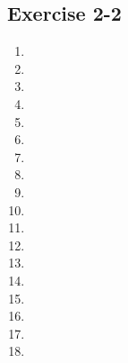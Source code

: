 \subsection{Exercise 2-2} %
\begin{multicols}{2}
\begin{enumerate}[itemsep=5pt, label=\textbf{\arabic*}. ] 
\item %
\item %
\item %
\item %
\item %
\item %
\item %
\item %
\item %
\item %
\item %
\item %
\item %
\item %
\item %
\item %
\item %
\item %
\end{enumerate}
\end{multicols}


